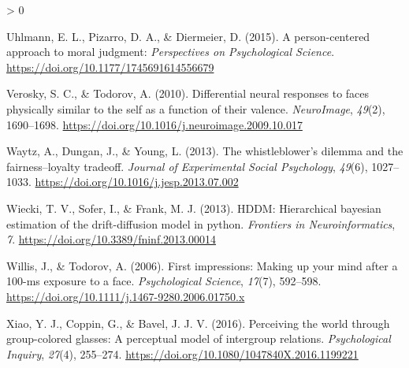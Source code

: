 \documentclass[
  english,
  man]{apa6}
\newlength{\cslhangindent}
\newenvironment{CSLReferences}[2] %
 {%
  \setlength{\parindent}{0pt}
  \ifodd #1 \everypar{\setlength{\hangindent}{\cslhangindent}}\ignorespaces\fi
  \ifnum #2 > 0
  \setlength{\parskip}{#2\baselineskip}
  \fi
 }%
 {}
\begin{document}
\begin{CSLReferences}{1}{0}
\leavevmode\hypertarget{ref-uhlmann_person-centered_2015}{}%
Uhlmann, E. L., Pizarro, D. A., \& Diermeier, D. (2015). A person-centered approach to moral judgment: \emph{Perspectives on Psychological Science}. \url{https://doi.org/10.1177/1745691614556679}

\leavevmode\hypertarget{ref-verosky_differential_2010}{}%
Verosky, S. C., \& Todorov, A. (2010). Differential neural responses to faces physically similar to the self as a function of their valence. \emph{{NeuroImage}}, \emph{49}(2), 1690--1698. \url{https://doi.org/10.1016/j.neuroimage.2009.10.017}

\leavevmode\hypertarget{ref-waytz_whistleblowers_2013}{}%
Waytz, A., Dungan, J., \& Young, L. (2013). The whistleblower's dilemma and the fairness--loyalty tradeoff. \emph{Journal of Experimental Social Psychology}, \emph{49}(6), 1027--1033. \url{https://doi.org/10.1016/j.jesp.2013.07.002}

\leavevmode\hypertarget{ref-wiecki_hddm_2013}{}%
Wiecki, T. V., Sofer, I., \& Frank, M. J. (2013). {HDDM}: Hierarchical bayesian estimation of the drift-diffusion model in python. \emph{Frontiers in Neuroinformatics}, \emph{7}. \url{https://doi.org/10.3389/fninf.2013.00014}

\leavevmode\hypertarget{ref-willis_first_2006}{}%
Willis, J., \& Todorov, A. (2006). First impressions: Making up your mind after a 100-ms exposure to a face. \emph{Psychological Science}, \emph{17}(7), 592--598. \url{https://doi.org/10.1111/j.1467-9280.2006.01750.x}

\leavevmode\hypertarget{ref-xiao_perceiving_2016}{}%
Xiao, Y. J., Coppin, G., \& Bavel, J. J. V. (2016). Perceiving the world through group-colored glasses: A perceptual model of intergroup relations. \emph{Psychological Inquiry}, \emph{27}(4), 255--274. \url{https://doi.org/10.1080/1047840X.2016.1199221}

\end{CSLReferences}

\endgroup
\end{document}
